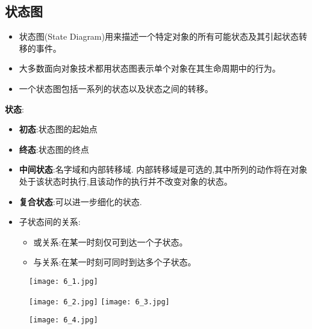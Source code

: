 \documentclass[../main.tex]{subfiles}
\begin{document}
\subsection{状态图}
\begin{itemize}
  \item 状态图(State Diagram)用来描述一个特定对象的所有可能状态及其引起状态转移的事件。
  \item 大多数面向对象技术都用状态图表示单个对象在其生命周期中的行为。
  \item 一个状态图包括一系列的状态以及状态之间的转移。
\end{itemize}
\textbf{状态}:
\begin{itemize}
  \item \textbf{初态}:状态图的起始点
  \item \textbf{终态}:状态图的终点
  \item \textbf{中间状态}:名字域和内部转移域.
    内部转移域是可选的,其中所列的动作将在对象处于该状态时执行,且该动作的执行并不改变对象的状态。
  \item \textbf{复合状态}:可以进一步细化的状态.
  \item 子状态间的关系:
    \begin{itemize}
      \item 或关系:在某一时刻仅可到达一个子状态。
      \item 与关系:在某一时刻可同时到达多个子状态。
    \end{itemize}
\end{itemize}
\begin{figure}[H]
  \begin{center}
    \texttt{[image: 6\_1.jpg]}
  \end{center}
\end{figure}
\begin{figure}[H]
  \begin{center}
    \texttt{[image: 6\_2.jpg]}
    \texttt{[image: 6\_3.jpg]}
  \end{center}
\end{figure}
\begin{figure}[H]
  \begin{center}
    \texttt{[image: 6\_4.jpg]}
  \end{center}
\end{figure}
\end{document}
